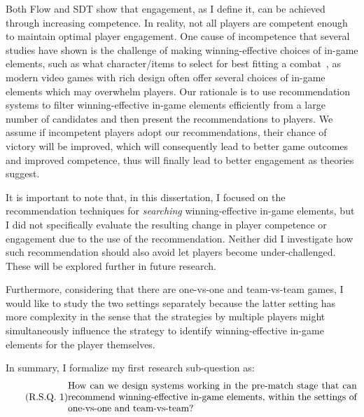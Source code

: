 Both Flow and SDT show that engagement, as I define it, can be achieved through increasing competence. In reality, not all players are competent enough to maintain optimal player engagement. One cause of incompetence that several studies have shown is the challenge of making winning-effective choices of in-game elements, such as what character/items to select for best fitting a combat~\citep{looi2018recommender,summerville2017reco,hanke2017reco}, as modern video games with rich design often offer several choices of in-game elements which may overwhelm players. Our rationale is to use recommendation systems to filter winning-effective in-game elements efficiently from a large number of candidates and then present the recommendations to players. We assume if incompetent players adopt our recommendations, their chance of victory will be improved, which will consequently lead to better game outcomes
and improved competence, thus will finally lead to better engagement as theories suggest.  


It is important to note that, in this dissertation, I focused on the recommendation techniques for \textit{searching} winning-effective in-game elements, but I did not specifically evaluate the resulting change in player competence or engagement due to the use of the recommendation. Neither did I investigate how such recommendation should also  avoid let players become under-challenged. These will be explored further in future research.


Furthermore, considering that there are one-vs-one and team-vs-team games, I would like to study the two settings separately because the latter setting has more complexity in the sense that the strategies by multiple players might simultaneously influence the strategy to identify winning-effective in-game elements for the player themselves. 


In summary, I formalize my first research sub-question as: 
\begin{equation}
  \tag{R.S.Q. 1}\label{rq1}
  \parbox{\dimexpr\linewidth-4em}{%
    \strut
    How can we design systems working in the pre-match stage that can recommend winning-effective in-game elements, within the settings of one-vs-one and team-vs-team?
    \strut
  }
\end{equation}



